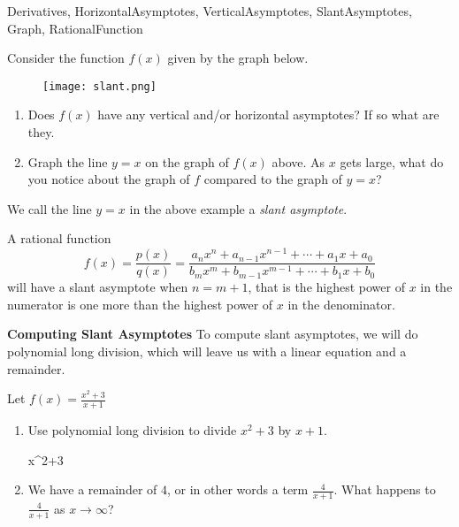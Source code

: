 \begin{tagblock}{Derivatives, HorizontalAsymptotes, VerticalAsymptotes, SlantAsymptotes, Graph, RationalFunction  }
\begin{question}


Consider the function $f(x)$ given by the graph below. 
\begin{figure}[h]
\centering
\texttt{[image: slant.png]} 
\end{figure}
\begin{enumerate}
\item Does $f(x)$ have any vertical and/or horizontal asymptotes?  If so what are they.  

\vspace{1in}
\item Graph the line $y=x$ on the graph of $f(x)$ above.  As $x$ gets large, what do you notice about the graph of $f$ compared to the graph of $y=x$?

\vspace{1in}
\end{enumerate}


We call the line $y=x$ in the above example a \emph{slant asymptote}.  

A rational function 
\[ f(x) = \frac{p(x)}{q(x)} = \frac{a_nx^n + a_{n-1}x^{n-1} + \cdots + a_1x+a_0}{b_mx^m + b_{m-1}x^{m-1} + \cdots + b_1x+b_0}\]
will have a slant asymptote when $n=m+1$, that is the highest power of $x$ in the numerator is one more than the highest power of $x$ in the denominator.  

\newpage

\textbf{Computing Slant Asymptotes}  To compute slant asymptotes, we will do polynomial long division, which will leave us with a linear equation and a remainder.


Let $\displaystyle f(x) = \frac{x^2+3}{x+1}$

\begin{enumerate}
\item Use polynomial long division to divide $x^2+3$ by $x+1$.

\vspace{.5in}

\begin{center}
 {x^2+3 \hspace{.5in}} 
\end{center}

\vspace{2in}
\item We have a remainder of $4$, or in other words a term $\frac{4}{x+1}$.  What happens to $\frac{4}{x+1}$ as $x \to \infty$?


\end{enumerate}
\end{question}
\end{tagblock}
